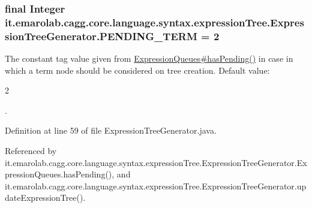 \hypertarget{classit_1_1emarolab_1_1cagg_1_1core_1_1language_1_1syntax_1_1expressionTree_1_1ExpressionTreeGenerator_a9f3b4791532465adb7950a8f63a06f33}{
\subsubsection[{P\-E\-N\-D\-I\-N\-G\-\_\-\-T\-E\-R\-M}]{\setlength{\rightskip}{0pt plus 5cm}final Integer it.\-emarolab.\-cagg.\-core.\-language.\-syntax.\-expression\-Tree.\-Expression\-Tree\-Generator.\-P\-E\-N\-D\-I\-N\-G\-\_\-\-T\-E\-R\-M = 2\hspace{0.3cm}{\ttfamily [static]}}}\label{classit_1_1emarolab_1_1cagg_1_1core_1_1language_1_1syntax_1_1expressionTree_1_1ExpressionTreeGenerator_a9f3b4791532465adb7950a8f63a06f33}
The constant tag value given from \hyperlink{classit_1_1emarolab_1_1cagg_1_1core_1_1language_1_1syntax_1_1expressionTree_1_1ExpressionTreeGenerator_1_1ExpressionQueues_a3e49595a6682e2ca900f3813c126483d}{Expression\-Queues\#has\-Pending()} in case in which a term node should be considered on tree creation. Default value\-:
\begin{DoxyCode}
2 
\end{DoxyCode}
 . 

Definition at line 59 of file Expression\-Tree\-Generator.\-java.



Referenced by it.\-emarolab.\-cagg.\-core.\-language.\-syntax.\-expression\-Tree.\-Expression\-Tree\-Generator.\-Expression\-Queues.\-has\-Pending(), and it.\-emarolab.\-cagg.\-core.\-language.\-syntax.\-expression\-Tree.\-Expression\-Tree\-Generator.\-update\-Expression\-Tree().

